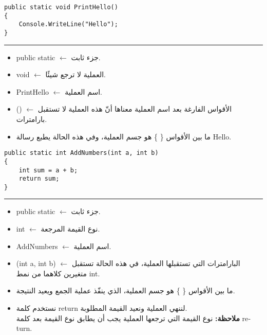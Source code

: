 \documentclass[12pt]{article}
\begin{document}
\begin{boxExample}[1]
\begin{english}
\begin{verbatim}
public static void PrintHello()
{
    Console.WriteLine("Hello");
}
\end{verbatim}
\end{english}
\hrule
\begin{itemize}
    \item \textenglish{public static} $\leftarrow$ جزء ثابت.
    \item \textenglish{void} $\leftarrow$ العملية لا ترجع شيئًا.
    \item \textenglish{PrintHello} $\leftarrow$ اسم العملية.
    \item \textenglish{()} $\leftarrow$ الأقواس الفارغة بعد اسم العملية معناها أنّ هذه العملية لا تستقبل بارامترات.
    \item ما بين الأقواس \textenglish{\{ \}} هو جسم العملية، وفي هذه الحالة يطبع رسالة \textenglish{Hello}.
\end{itemize}
\end{boxExample}

\begin{boxExample}[2]
\begin{english}
\begin{verbatim}
public static int AddNumbers(int a, int b)
{
    int sum = a + b;
    return sum;
}
\end{verbatim}
\end{english}
\hrule
\begin{itemize}
    \item \textenglish{public static} $\leftarrow$ جزء ثابت.
    \item \textenglish{int} $\leftarrow$ نوع القيمة المرجعة.
    \item \textenglish{AddNumbers} $\leftarrow$ اسم العملية.
    \item \textenglish{(int a, int b)} $\leftarrow$ البارامترات التي تستقبلها العملية، في هذه الحالة تستقبل متغيرين كلاهما من نمط \textenglish{int}.
    \item ما بين الأقواس \textenglish{\{ \}} هو جسم العملية، الذي ينفّذ عملية الجمع ويعيد النتيجة.
    \item نستخدم كلمة \textenglish{return} لننهي العملية ونعيد القيمة المطلوبة. \\
    \textbf{ملاحظة:} نوع القيمة التي ترجعها العملية يجب أن يطابق نوع القيمة بعد كلمة \textenglish{return}.
\end{itemize}
\end{boxExample}
\end{document}
